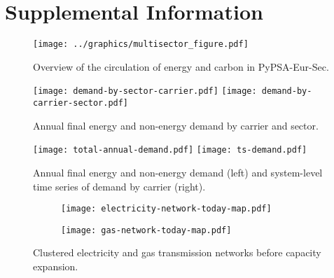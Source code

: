 
\section*{Supplemental Information}
\label{sec:si}
\normalsize

\begin{figure}[ht!]
    \centering
    \texttt{[image: ../graphics/multisector\_figure.pdf]}
    \caption{Overview of the circulation of energy and carbon in PyPSA-Eur-Sec.}
    \label{fig:multisector}
\end{figure}

\begin{figure}[ht!]
    \centering
    \texttt{[image: demand-by-sector-carrier.pdf]}
    \texttt{[image: demand-by-carrier-sector.pdf]}
    \caption{Annual final energy and non-energy demand by carrier and sector.}
    \label{fig:demand-by-sector-carrier}
\end{figure}

\begin{figure}[ht!]
    \centering
    \texttt{[image: total-annual-demand.pdf]}
    \texttt{[image: ts-demand.pdf]}
    \caption{Annual final energy and non-energy demand (left) and system-level time series of demand by carrier (right).}
    \label{fig:demand-time}
\end{figure}

\begin{figure}[ht!]
    \centering
\begin{subfigure}[t]{0.49\textwidth}
    \centering
    \texttt{[image: electricity-network-today-map.pdf]}
\end{subfigure}
\begin{subfigure}[t]{0.49\textwidth}
    \centering
    \texttt{[image: gas-network-today-map.pdf]}
\end{subfigure}
\caption{Clustered electricity and gas transmission networks before capacity expansion.}
\label{fig:clustered-networks}
\end{figure}



